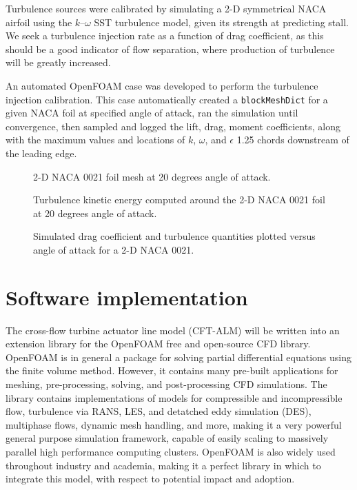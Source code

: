 Turbulence sources were calibrated by simulating a 2-D symmetrical NACA airfoil
using the $k$--$\omega$ SST turbulence model, given its strength at predicting
stall. We seek a turbulence injection rate as a function of drag coefficient, as
this should be a good indicator of flow separation, where production of
turbulence will be greatly increased.

An automated OpenFOAM case was developed to perform the turbulence injection
calibration. This case automatically created a \texttt{blockMeshDict} for a
given NACA foil at specified angle of attack, ran the simulation until
convergence, then sampled and logged the lift, drag, moment coefficients, along
with the maximum values and locations of $k$, $\omega$, and $\epsilon$ 1.25
chords downstream of the leading edge.

\begin{figure}[ht]
    \centering
    
    \caption{2-D NACA 0021 foil mesh at 20 degrees angle of attack.}
    
    \label{fig:NACA-foil-mesh}
\end{figure}


\begin{figure}[ht]
    \centering
    
    \caption{Turbulence kinetic energy computed around the 2-D NACA 0021 foil at
        20 degrees angle of attack.}
    
    \label{fig:NACA-foil-k}
\end{figure}


\begin{figure}[ht]
    \centering
    
    \caption{Simulated drag coefficient and turbulence quantities plotted versus
        angle of attack for a 2-D NACA 0021.}
    
    \label{fig:NACA-foil-turbulence}
\end{figure}



\section{Software implementation}

The cross-flow turbine actuator line model (CFT-ALM) will be written into an
extension library for the OpenFOAM free and open-source CFD library. OpenFOAM is
in general a package for solving partial differential equations using the finite
volume method. However, it contains many pre-built applications for meshing,
pre-processing, solving, and post-processing CFD simulations. The library
contains implementations of models for compressible and incompressible flow,
turbulence via RANS, LES, and detatched eddy simulation (DES), multiphase flows,
dynamic mesh handling, and more, making it a very powerful general purpose
simulation framework, capable of easily scaling to massively parallel high
performance computing clusters. OpenFOAM is also widely used throughout industry
and academia, making it a perfect library in which to integrate this model, with
respect to potential impact and adoption.

